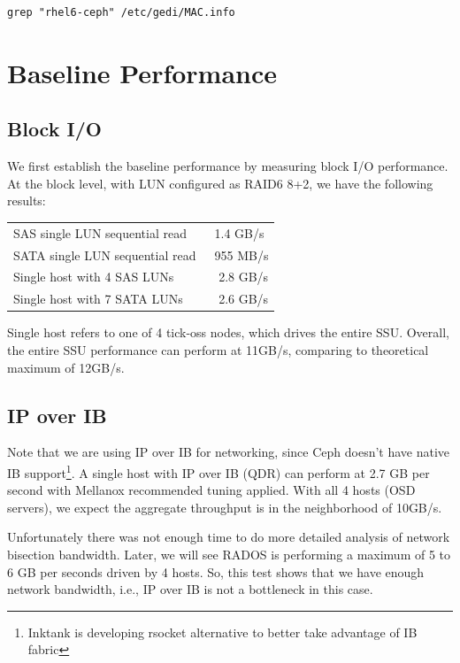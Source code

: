 \documentclass{article}
\begin{document}
\begin{Verbatim}
grep "rhel6-ceph" /etc/gedi/MAC.info
\end{Verbatim}


\section{Baseline Performance}


\subsection*{Block I/O}
We first establish the baseline performance by measuring block I/O performance.
At the block level, with LUN configured as RAID6 8+2, we have the following
results:

\begin{table}[htb]
\centering
\begin{tabular}{ll}
    \toprule
    SAS single LUN sequential read & ~1.4 GB/s \\
    SATA single LUN sequential read & ~955 MB/s \\[0.5em]
    Single host with 4 SAS LUNs & ~ 2.8 GB/s \\
    Single host with 7 SATA LUNs & ~ 2.6 GB/s \\
    \bottomrule
\end{tabular}

\end{table}

Single host refers to one of 4 tick-oss nodes, which drives the entire SSU.
Overall, the entire SSU performance can perform at 11GB/s, comparing to
theoretical maximum of 12GB/s.


\subsection*{IP over IB}

Note that we are using IP over IB for networking, since Ceph doesn't have
native IB support\footnote{Inktank is developing rsocket alternative to better take
advantage of IB fabric}.
A single host with IP over IB (QDR) can perform at 2.7 GB per second with
Mellanox recommended tuning applied. With all 4 hosts (OSD servers), we expect
the aggregate throughput is in the neighborhood of 10GB/s.

Unfortunately there was not enough time to do more detailed analysis of network
bisection bandwidth. Later, we will see RADOS is performing a
maximum of 5 to 6 GB per seconds driven by 4 hosts.  So, this test shows that we
have enough network bandwidth, i.e., IP over IB is not a bottleneck in this
case.
\end{document}

